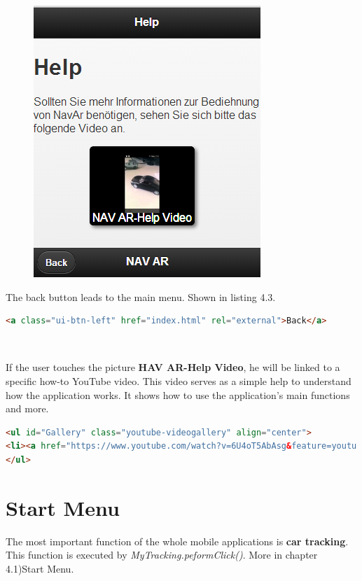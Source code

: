 \begin{figure}[b]
\centering
\includegraphics[width=0.5\linewidth]{graphics/chapter4/2}
\caption{}
\label{fig:2}
\end{figure}
\newpage

The back button leads to the main menu. Shown in listing 4.3.
\\
\begin{lstlisting}[language=html, caption= 
Back button,captionpos=b]
<a class="ui-btn-left" href="index.html" rel="external">Back</a>
\end{lstlisting}
\
\


If the user touches the picture \textbf{HAV AR-Help Video}, he will be linked to a specific how-to YouTube video. This video serves as a simple help to understand how the application works. It shows how to use the application's main functions and more.
\\
\begin{lstlisting}[language=html, caption= 
Help video,captionpos=b]
<ul id="Gallery" class="youtube-videogallery" align="center">
<li><a href="https://www.youtube.com/watch?v=6U4oT5AbAsg&feature=youtu.be">NAV AR-Help Video</a></li>
</ul>
\end{lstlisting}

\section{Start Menu}
The most important function of the whole mobile applications is \textbf{car tracking}. This function is executed by \textit{MyTracking.peformClick()}. More in chapter 4.1)Start Menu.
\\

